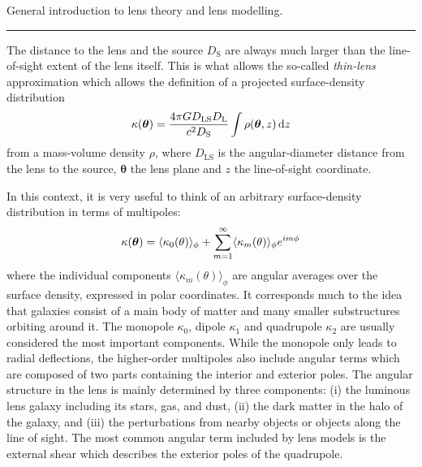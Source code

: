 
General introduction to lens theory and lens modelling.

\par\noindent\rule{\textwidth}{0.8pt}

The distance to the lens and the source $D_\mathrm{S}$ are always much larger
than the line-of-sight extent of the lens itself. This is what allows the
so-called \textit{thin-lens} approximation which allows the definition of a
projected surface-density distribution
%
\begin{equation}\eqlbl{match:thinlens}
  \kappa(\bm\theta) = \frac{4\pi GD_\mathrm{LS}D_\mathrm{L}}{c^2D_\mathrm{S}}
    \int \rho(\bm\theta, z)\,\mathrm{d}z
\end{equation}
%
from a mass-volume density $\rho$, where $D_\mathrm{LS}$ is the angular-diameter
distance from the lens to the source, $\bm\theta$ the lens plane and $z$ the
line-of-sight coordinate.

In this context, it is very useful to think of an arbitrary surface-density
distribution in terms of multipoles:
%
\begin{equation}\eqlbl{match:multipoles}%
  \kappa(\bm\theta) = \langle\kappa_0(\theta)\rangle_{\phi} 
  + \sum^{\infty}_{m=1} \langle\kappa_{m}(\theta)\rangle_{\phi} e^{im\phi}
\end{equation}%
%
where the individual components $\langle\kappa_{m}(\theta)\rangle_{\phi}$ are
angular averages over the surface density, expressed in polar coordinates.  It
corresponds much to the idea that galaxies consist of a main body of matter and
many smaller substructures orbiting around it.  The monopole $\kappa_0$, dipole
$\kappa_1$ and quadrupole $\kappa_2$ are usually considered the most important
components.  While the monopole only leads to radial deflections, the
higher-order multipoles also include angular terms which are composed of two
parts containing the interior and exterior poles.  The angular structure in the
lens is mainly determined by three components: (i) the luminous lens galaxy
including its stars, gas, and dust, (ii) the dark matter in the halo of the
galaxy, and (iii) the perturbations from nearby objects or objects along the
line of sight.  The most common angular term included by lens models is the
external shear which describes the exterior poles of the quadrupole.

